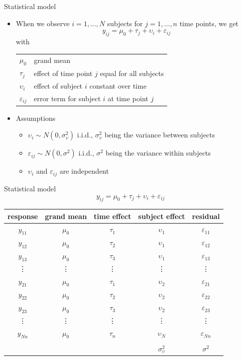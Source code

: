 \documentclass[aspectratio=169]{beamer}
\begin{document}
\begin{frame}{Statistical model}
  \begin{itemize}
    \item When we observe $i = 1, \ldots, N$ subjects for $j = 1, \ldots,
      n$ time points, we get
\[
  y_{ij} = \mu_0 + \tau_j + \upsilon_i + \varepsilon_{ij}
\]
with 

\begin{tabular}{ll}
  $\mu_0$ & grand mean\\
  $\tau_j$ & effect of time point $j$ equal for all subjects\\
  $\upsilon_i$ & effect of subject $i$ constant over time\\
  $\varepsilon_{ij}$ & error term for subject $i$ at time point $j$
\end{tabular}

\item Assumptions
\begin{itemize}
\item $\upsilon_i \sim N(0, \sigma^2_\upsilon)$ i.i.d.,
  $\sigma^2_\upsilon$ being the variance between subjects
\item $\varepsilon_{ij} \sim N(0, \sigma^2)$ i.i.d., $\sigma^2$ being
      the variance within subjects
    \item $\upsilon_i$ and $\varepsilon_{ij}$ are independent
\end{itemize}
  \end{itemize}
\end{frame}

\begin{frame}{Statistical model}
  \[
  y_{ij} = \mu_0 + \tau_j + \upsilon_i + \varepsilon_{ij}
  \]
\centering
  \begin{tabular}{ccccc}
    \hline
    response & grand mean & time effect & subject effect  & residual \\
    \hline
    $y_{11}$ & $\mu_0$ & $\tau_1$  & $\upsilon_{1}$ & $\varepsilon_{11}$ \\
    $y_{12}$ & $\mu_0$ & $\tau_2$  & $\upsilon_{1}$ & $\varepsilon_{12}$ \\
    $y_{13}$ & $\mu_0$ & $\tau_3$  & $\upsilon_{1}$ & $\varepsilon_{13}$ \\
    \vdots & \vdots & \vdots   &  \vdots & \vdots \\
    $y_{21}$ & $\mu_0$ & $\tau_1$  & $\upsilon_{2}$ & $\varepsilon_{21}$ \\
    $y_{22}$ & $\mu_0$ & $\tau_2$  & $\upsilon_{2}$ & $\varepsilon_{22}$ \\
    $y_{23}$ & $\mu_0$ & $\tau_3$  & $\upsilon_{2}$ & $\varepsilon_{23}$ \\
    \vdots & \vdots & \vdots   &  \vdots & \vdots \\
    $y_{Nn}$ & $\mu_0$ & $\tau_n$  & $\upsilon_{N}$ & $\varepsilon_{Nn}$ \\
    \hline\\[-2ex]
    \only<2>{$\sigma_{\upsilon}^2 + \sigma^2$ & & &
    $\sigma_{\upsilon}^2$ & $\sigma^2$} \\
  \end{tabular}
\end{frame}
\end{document}
